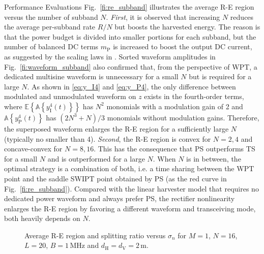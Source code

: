 \documentclass[journal]{IEEEtran}
\begin{document}
\begin{section}{Performance Evaluations}
		Fig.~\ref{fi:re_subband} illustrates the average R-E region versus the number of subband $N$. \textit{First}, it is observed that increasing $N$ reduces the average per-subband rate $R/N$ but boosts the harvested energy. The reason is that the power budget is divided into smaller portions for each subband, but the number of balanced DC terms $m_\mathrm{P}$ is increased to boost the output DC current, as suggested by the scaling laws in \cite{Clerckx2018b}. Sorted waveform amplitudes in Fig.~\ref{fi:waveform_subband} also confirmed that, from the perspective of WPT, a dedicated multisine waveform is unnecessary for a small $N$ but is required for a large $N$. As shown in \eqref{eq:y_I4} and \eqref{eq:y_P4}, the only difference between modulated and unmodulated waveform on $z$ exists in the fourth-order terms, where $\mathbb{E}\left\{\mathbb{A}\left\{y_{\mathrm{I}}^4(t)\right\}\right\}$ has $N^2$ monomials with a modulation gain of \num{2} and $\mathbb{A}\left\{y_{\mathrm{P}}^4(t)\right\}$ has $(2N^3+N)/3$ monomials without modulation gains. Therefore, the superposed waveform enlarges the R-E region for a sufficiently large $N$ (typically no smaller than 4). \textit{Second}, the R-E region is convex for $N = 2, 4$ and concave-convex for $N = 8, 16$. This has the consequence that PS outperforms TS for a small $N$ and is outperformed for a large $N$. When $N$ is in between, the optimal strategy is a combination of both, i.e. a time sharing between the WPT point and the saddle SWIPT point obtained by PS (as the red curve in Fig.~\ref{fi:re_subband}). Compared with the linear harvester model that requires no dedicated power waveform and always prefer PS, the rectifier nonlinearity enlarges the R-E region by favoring a different waveform and transceiving mode, both heavily depends on $N$.

		\begin{figure}[!t]
			\centering
			\begin{adjustbox}{width=0.9\columnwidth}
				
			\end{adjustbox}
			\caption{Average R-E region and splitting ratio versus $\sigma_n$ for $M=1$, $N=16$, $L=20$, $B=1\,\si{\MHz}$ and $d_{\mathrm{H}}=d_{\mathrm{V}}=2\,\si{\meter}$.}
			\label{fi:re_noise}
		\end{figure}


\end{section}
\end{document}

